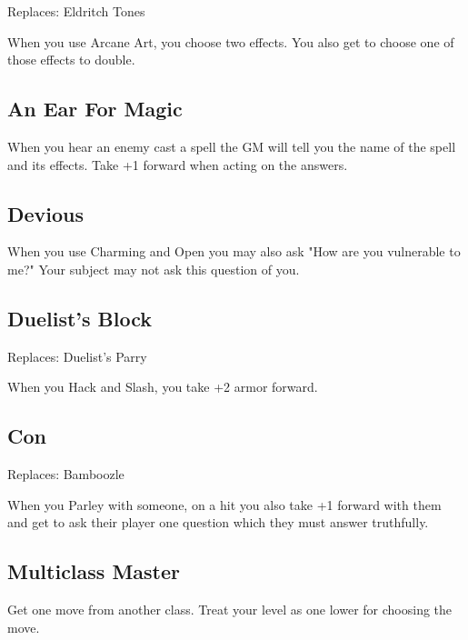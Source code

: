 Replaces: Eldritch Tones

         

When you use Arcane Art, you choose two effects. You also get to choose one of those effects to double.

         
\subsection{An Ear For Magic}    
         

When you hear an enemy cast a spell the GM will tell you the name of the spell and its effects. Take +1 forward when acting on the answers.

         
\subsection{Devious}   
         

When you use Charming and Open you may also ask "How are you vulnerable to me?" Your subject may not ask this question of you.

         
\subsection{Duelist's Block}    
         

Replaces: Duelist's Parry

         

When you Hack and Slash, you take +2 armor forward.

         
\subsection{Con}   
         

Replaces: Bamboozle

         

When you Parley with someone, on a hit you also take +1 forward with them and get to ask their player one question which they must answer truthfully.

         
\subsection{Multiclass Master}    
         

Get one move from another class. Treat your level as one lower for choosing the move.

       

                
